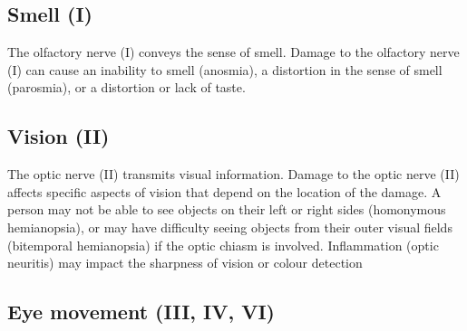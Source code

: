 \hypertarget{smell-i}{%
\subsection{Smell (I)}\label{smell-i}}

The olfactory nerve (I) conveys the sense of smell. Damage to the olfactory nerve (I) can cause an inability to smell (anosmia), a distortion in the sense of smell (parosmia), or a distortion or lack of taste.

\hypertarget{vision-ii}{%
\subsection{Vision (II)}\label{vision-ii}}

The optic nerve (II) transmits visual information. Damage to the optic nerve (II) affects specific aspects of vision that depend on the location of the damage. A person may not be able to see objects on their left or right sides (homonymous hemianopsia), or may have difficulty seeing objects from their outer visual fields (bitemporal hemianopsia) if the optic chiasm is involved. Inflammation (optic neuritis) may impact the sharpness of vision or colour detection

\hypertarget{eye-movement-iii-iv-vi}{%
\subsection{Eye movement (III, IV, VI)}\label{eye-movement-iii-iv-vi}}

